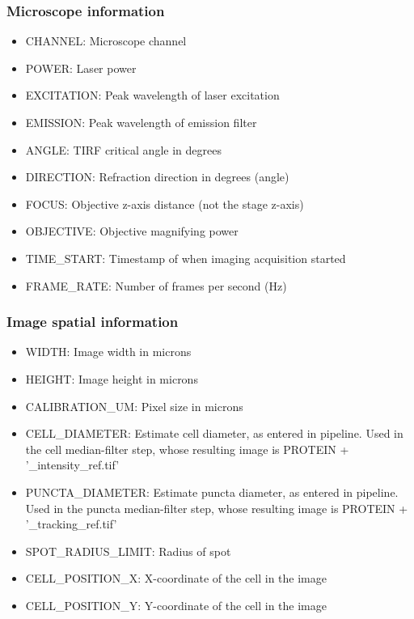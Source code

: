 \subsubsection{Microscope information}
\begin{itemize}
\item CHANNEL: Microscope channel
\item POWER: Laser power
\item EXCITATION: Peak wavelength of laser excitation
\item EMISSION: Peak wavelength of emission filter
\item ANGLE: TIRF critical angle in degrees
\item DIRECTION: Refraction direction in degrees (angle)
\item FOCUS: Objective z-axis distance (not the stage z-axis)
\item OBJECTIVE: Objective magnifying power
\item TIME\_START: Timestamp of when imaging acquisition started
\item FRAME\_RATE: Number of frames per second (Hz)
\end{itemize}

\subsubsection{Image spatial information}
\begin{itemize}
\item WIDTH: Image width in microns
\item HEIGHT: Image height in microns
\item CALIBRATION\_UM: Pixel size in microns
\item CELL\_DIAMETER: Estimate cell diameter, as entered in pipeline. Used in the cell median-filter step, whose resulting image is PROTEIN + '\_intensity\_ref.tif'
\item PUNCTA\_DIAMETER: Estimate puncta diameter, as entered in pipeline. Used in the puncta median-filter step, whose resulting image is PROTEIN + '\_tracking\_ref.tif'
\item SPOT\_RADIUS\_LIMIT: Radius of spot
\item CELL\_POSITION\_X: X-coordinate of the cell in the image
\item CELL\_POSITION\_Y: Y-coordinate of the cell in the image
\end{itemize}

